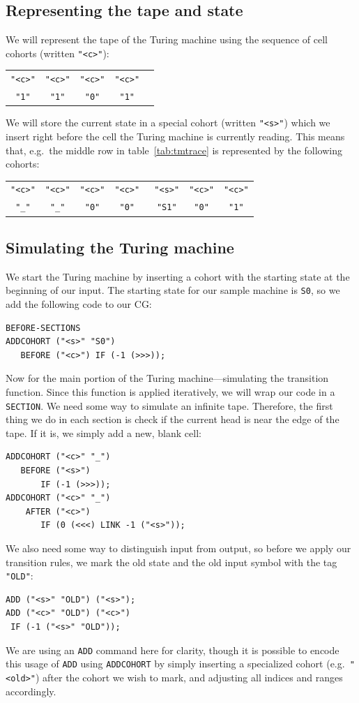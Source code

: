 \documentclass[11pt]{article}
\def\t#1{\texttt{#1}}
\def\h#1{{\tt \color{gray} #1}}
\begin{document}
\subsection{Representing the tape and state}
We will represent the tape of the Turing machine using the sequence of cell
cohorts (written \t{"<c>"}):
\begin{center}
  \renewcommand{\tabcolsep}{2.5pt}
  \begin{tabular}{ccccc}
    \t{"<c>"} & \t{"<c>"} & \t{"<c>"} & \t{"<c>"} \\
    \t{"1"}   & \t{"1"}   & \t{"0"}   & \t{"1"}  
  \end{tabular}
\end{center}
We will store the current state in a special cohort (written \t{"<s>"}) which we
insert right before the cell the Turing machine is currently reading. This means
that, e.g.\ the middle row in table~\ref{tab:tmtrace} is represented by the
following cohorts:
\begin{center}
  \renewcommand{\tabcolsep}{1pt}
  \begin{tabular}{ccccccc}
    \t{"<c>"} & \t{"<c>"} & \t{"<c>"} & \t{"<c>"} & \h{"<s>"} & \t{"<c>"} & \t{"<c>"} \\
    \t{"\_"}  & \t{"\_"}  & \t{"0"}   & \t{"0"}   & \h{"S1"}  & \t{"0"}   & \t{"1"}
  \end{tabular}
\end{center}

\subsection{Simulating the Turing machine}
We start the Turing machine by inserting a cohort with the starting state at the
beginning of our input. The starting state for our sample machine is \t{S0}, so
we add the following code to our CG:
\begin{Verbatim}
BEFORE-SECTIONS
ADDCOHORT ("<s>" "S0") 
   BEFORE ("<c>") IF (-1 (>>>));
\end{Verbatim}
Now for the main portion of the Turing machine---simulating the transition 
function. Since this function is applied iteratively, we will wrap our code in a
\t{SECTION}.
We need some way to simulate an infinite tape. Therefore, the first thing we do
in each section is check if the current head is near the edge of the tape. If it
is, we simply add a new, blank cell:
\begin{Verbatim}
ADDCOHORT ("<c>" "_")
   BEFORE ("<s>")
       IF (-1 (>>>));
ADDCOHORT ("<c>" "_") 
    AFTER ("<c>")
       IF (0 (<<<) LINK -1 ("<s>"));
\end{Verbatim}
We also need some way to distinguish input from output, so before we apply our
transition rules, we mark the old state and the old input symbol with the tag
\t{"OLD"}: 
\begin{Verbatim}
ADD ("<s>" "OLD") ("<s>");
ADD ("<c>" "OLD") ("<c>")
 IF (-1 ("<s>" "OLD"));
\end{Verbatim}
We are using an \t{ADD} command here for clarity, though it is possible to
encode this usage of \t{ADD} using \t{ADDCOHORT} by simply inserting a
specialized cohort (e.g.\ \t{"<old>"}) after the cohort we wish to mark, and
adjusting all indices and ranges accordingly.
\end{document}
